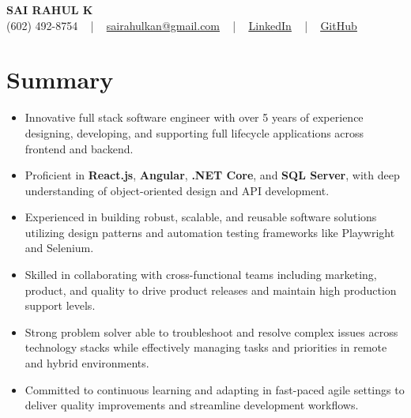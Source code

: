 \documentclass[letterpaper,11pt]{article}
\newcommand{\resumeItem}[1]{
  \item\footnotesize{
    {#1 \vspace{-2pt}}
  }
}
\newcommand{\resumeItemListStart}{\begin{itemize}[leftmargin=*]}
\newcommand{\resumeItemListEnd}{\end{itemize}\vspace{-5pt}}
\begin{document}
\begin{center}
    {\fontsize{14pt}{12pt}\selectfont \textbf{\MakeUppercase{Sai Rahul K}}}\\ \vspace{2pt}
    \fontsize{10pt}{12pt}\selectfont (602) 492-8754 ~ | ~ \href{mailto:sairahulkan@gmail.com}{sairahulkan@gmail.com} ~ | ~
    \href{https://www.linkedin.com/in/rq123/}{\color{blue}\underline{LinkedIn}} ~ | ~
    \href{https://github.com/kanrahuldo}{\color{blue}\underline{GitHub}}~
    \vspace{-8pt}
\end{center}

\section{Summary}
\fontsize{9pt}{10pt}\selectfont
\resumeItemListStart
    \resumeItem{Innovative full stack software engineer with over 5 years of experience designing, developing, and supporting full lifecycle applications across frontend and backend.}
    \resumeItem{Proficient in \textbf{React.js}, \textbf{Angular}, \textbf{.NET Core}, and \textbf{SQL Server}, with deep understanding of object-oriented design and API development.}
    \resumeItem{Experienced in building robust, scalable, and reusable software solutions utilizing design patterns and automation testing frameworks like Playwright and Selenium.}
    \resumeItem{Skilled in collaborating with cross-functional teams including marketing, product, and quality to drive product releases and maintain high production support levels.}
    \resumeItem{Strong problem solver able to troubleshoot and resolve complex issues across technology stacks while effectively managing tasks and priorities in remote and hybrid environments.}
    \resumeItem{Committed to continuous learning and adapting in fast-paced agile settings to deliver quality improvements and streamline development workflows.}
\resumeItemListEnd
\vspace{-6pt}
\end{document}
